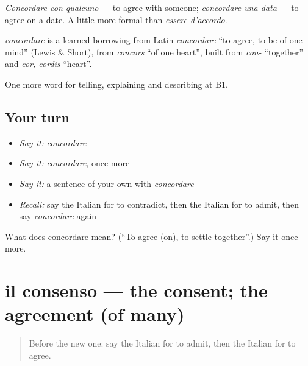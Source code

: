 \emph{Concordare con qualcuno} — to agree with someone; \emph{concordare una data} — to agree on a date. A little more formal than \emph{essere d'accordo}.

\begin{cousinweb}
\emph{concordare} is a learned borrowing from Latin \emph{concordāre} \textquotedblleft{}to agree, to be of one mind\textquotedblright{} (Lewis \& Short), from \emph{concors} \textquotedblleft{}of one heart\textquotedblright{}, built from \emph{con-} \textquotedblleft{}together\textquotedblright{} and \emph{cor, cordis} \textquotedblleft{}heart\textquotedblright{}.
\end{cousinweb}

\begin{grammarlens}[title={What you've built}]
One more word for telling, explaining and describing at B1.
\end{grammarlens}

\subsection*{Your turn}
\begin{itemize}
\raggedright
  \item \emph{Say it:} \emph{concordare}
  \item \emph{Say it:} \emph{concordare}, once more
  \item \emph{Say it:} a sentence of your own with \emph{concordare}
  \item \emph{Recall:} say the Italian for to contradict, then the Italian for to admit, then say \emph{concordare} again
\end{itemize}

\begin{tcolorbox}[breakable,colback=teal!4,colframe=teal!35!black,title={Before you move on}]
What does concordare mean? (\textquotedblleft{}To agree (on), to settle together\textquotedblright{}.) Say it once more.
\end{tcolorbox}
\section[il consenso]{il consenso — the consent; the agreement (of many)}

\label{lesson:IT-C342-consenso}



\begin{quote}
Before the new one: say the Italian for to admit, then the Italian for to agree.
\end{quote}

